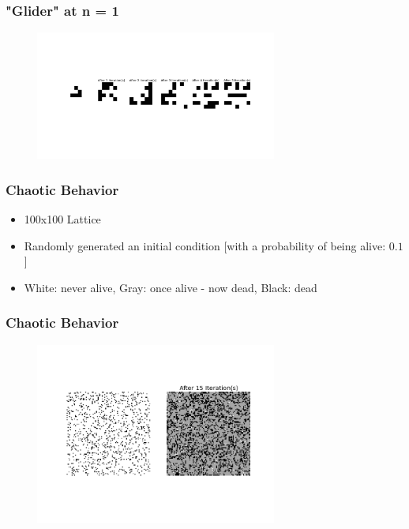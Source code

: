 \documentclass{beamer}
\begin{document}
\frame
{
 \frametitle{"Glider" at n = 1}
  \begin{figure}
   \includegraphics[width = 300]{glider12}
   \end{figure}

}


\frame
{
  \frametitle{Chaotic Behavior}

 \begin{itemize}
  \item 100x100 Lattice
  \item Randomly generated an initial condition [with a probability of being alive: $0.1$]
  \item White: never alive, Gray: once alive - now dead, Black: dead
  \end{itemize}  
  
}

\frame
{
  \frametitle{Chaotic Behavior}
   \begin{figure}
   \includegraphics[width = 300]{chaos12}
   \end{figure}

}
\end{document}
